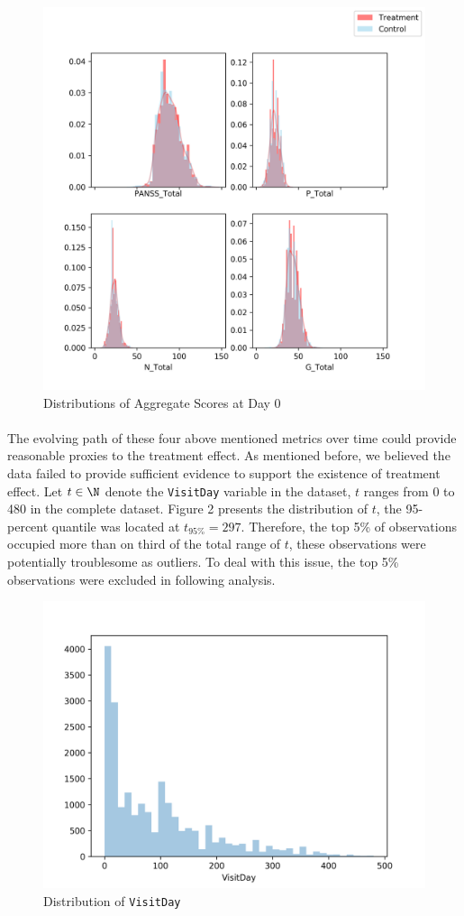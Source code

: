 \documentclass[11pt]{article}
\begin{document}
	\begin{figure}[H]
		\centering
		\includegraphics[width=0.7\linewidth]{figures/dist_initial_scores.png}
		\caption{Distributions of Aggregate Scores at Day 0}
	\end{figure}

	\paragraph{}The evolving path of these four above mentioned metrics over time could provide reasonable proxies to the treatment effect. As mentioned before, we believed the data failed to provide sufficient evidence to support the existence of treatment effect. Let $t \in \N$ denote the \texttt{VisitDay} variable in the dataset, $t$ ranges from 0 to 480 in the complete dataset. Figure 2 presents the distribution of $t$, the 95-percent quantile was located at $t_{95\%} = 297$. Therefore, the top 5\% of observations occupied more than on third of the total range of $t$, these observations were potentially troublesome as outliers. To deal with this issue, the top 5\% observations were excluded in following analysis.

	\begin{figure}[H]
		\centering
		\includegraphics[width=0.7\linewidth]{figures/dist_visit_day_all.png}
		\caption{Distribution of \texttt{VisitDay}}
	\end{figure}
	
\end{document}
